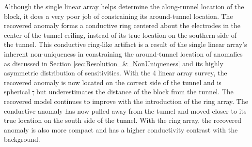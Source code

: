 \documentclass[preprint,authoryear,12pt]{elsarticle}
\providecommand{\DIFdeltex}[1]{{\protect\color{red}\sout{#1}}}                      %
\providecommand{\DIFdelbegin}{} %
\providecommand{\DIFdelend}{} %
\providecommand{\DIFdel}[1]{\texorpdfstring{\DIFdeltex{#1}}{}} %
\begin{document}
Although the single linear array helps determine the along-tunnel location of the block, it does a very poor job of constraining its around-tunnel location. The recovered anomaly forms a conductive ring centered about the electrodes in the center of the tunnel ceiling, instead of its true location on the southern side of the tunnel. This conductive ring-like artifact is a result of the single linear array's inherent non-uniqueness in constraining the around-tunnel location of anomalies as discussed in Section \ref{sec:Resolution_&_NonUniqueness} and its highly asymmetric distribution of sensitivities. With the 4 linear array survey, the recovered anomaly is now located on the correct side of the tunnel and is spherical \DIFdelbegin \DIFdel{, }\DIFdelend but underestimates the distance of the block from the tunnel. The recovered model continues to improve with the introduction of the ring array. The conductive anomaly has now pulled away from the tunnel and moved closer to its true location on the south side of the tunnel. With the ring array, the recovered anomaly is also more compact and has a higher conductivity contrast with the background.


\DIFdelbegin %
\end{document}
